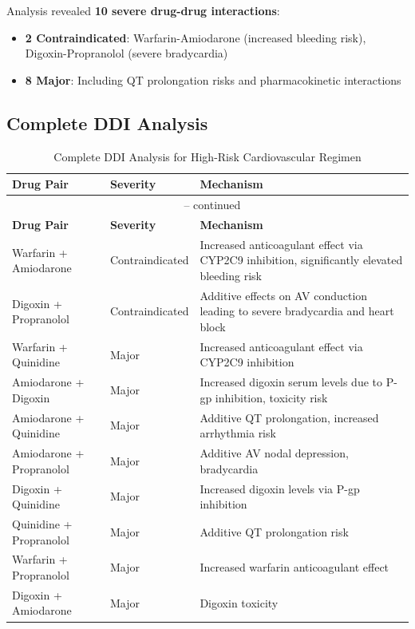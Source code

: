 \documentclass[11pt,a4paper]{article}
\begin{document}
Analysis revealed \textbf{10 severe drug-drug interactions}:
\begin{itemize}
    \item \textbf{2 Contraindicated}: Warfarin-Amiodarone (increased bleeding risk), Digoxin-Propranolol (severe bradycardia)
    \item \textbf{8 Major}: Including QT prolongation risks and pharmacokinetic interactions
\end{itemize}

\subsection{Complete DDI Analysis}

\begin{longtable}{llp{6cm}}
\caption{Complete DDI Analysis for High-Risk Cardiovascular Regimen} \label{tab:ddi_details} \\
\toprule
\textbf{Drug Pair} & \textbf{Severity} & \textbf{Mechanism} \\
\midrule
\endfirsthead
\multicolumn{3}{c}{\tablename\ \thetable{} -- continued} \\
\toprule
\textbf{Drug Pair} & \textbf{Severity} & \textbf{Mechanism} \\
\midrule
\endhead
\bottomrule
\endfoot
Warfarin + Amiodarone & Contraindicated & Increased anticoagulant effect via CYP2C9 inhibition, significantly elevated bleeding risk \\
Digoxin + Propranolol & Contraindicated & Additive effects on AV conduction leading to severe bradycardia and heart block \\
Warfarin + Quinidine & Major & Increased anticoagulant effect via CYP2C9 inhibition \\
Amiodarone + Digoxin & Major & Increased digoxin serum levels due to P-gp inhibition, toxicity risk \\
Amiodarone + Quinidine & Major & Additive QT prolongation, increased arrhythmia risk \\
Amiodarone + Propranolol & Major & Additive AV nodal depression, bradycardia \\
Digoxin + Quinidine & Major & Increased digoxin levels via P-gp inhibition \\
Quinidine + Propranolol & Major & Additive QT prolongation risk \\
Warfarin + Propranolol & Major & Increased warfarin anticoagulant effect \\
Digoxin + Amiodarone & Major & Digoxin toxicity \\
\end{longtable}
\end{document}
